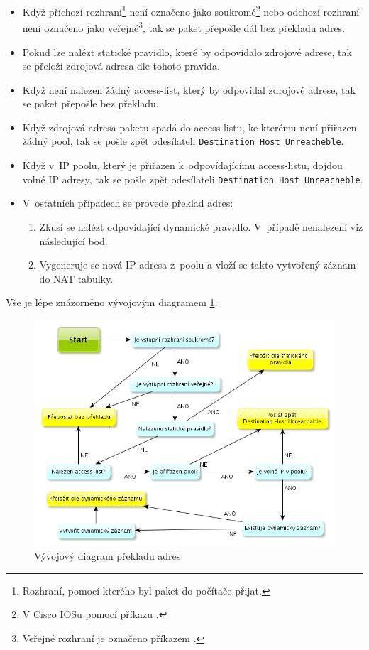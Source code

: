 \begin{itemize}
\item Když příchozí rozhraní\footnote{Rozhraní, pomocí kterého byl paket do počítače přijat.} není označeno jako soukromé\footnote{V Cisco IOSu pomocí příkazu .} nebo odchozí rozhraní není označeno jako veřejné\footnote{Veřejné rozhraní je označeno příkazem .}, tak se paket přepošle dál bez překladu adres.

\item Pokud lze nalézt statické pravidlo, které by odpovídalo zdrojové adrese, tak se přeloží zdrojová adresa dle tohoto pravida.

\item Když není nalezen žádný access-list, který by odpovídal zdrojové adrese, tak se paket přepošle bez překladu.

\item Když zdrojová adresa paketu spadá do access-listu, ke kterému není přiřazen žádný pool, tak se pošle zpět odesílateli \verb|Destination Host Unreacheble|.

\item Když v~IP poolu, který je přiřazen k~odpovídajícímu access-listu, dojdou volné IP adresy, tak se pošle zpět odesílateli \verb|Destination Host Unreacheble|.

\item V~ostatních případech se provede překlad adres:
    \begin{enumerate}
    \item Zkusí se nalézt odpovídající dynamické pravidlo. V~případě nenalezení viz následující bod.
    \item Vygeneruje se nová IP adresa z~poolu a vloží se takto vytvořený záznam do NAT tabulky.
    \end{enumerate}
\end{itemize}

Vše je lépe znázorněno vývojovým diagramem \ref{fig:nat_decision}.

\begin{figure}[b]
\begin{center}
\includegraphics[width=16cm]{figures/nat_decision}
\caption{Vývojový diagram překladu adres}
\label{fig:nat_decision}
\end{center}
\end{figure}

